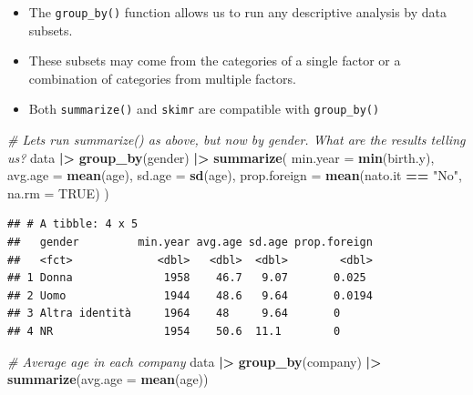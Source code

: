 \documentclass[
]{book}
\newenvironment{Shaded}{\begin{snugshade}}{\end{snugshade}}
\newcommand{\AttributeTok}[1]{\textcolor[rgb]{0.13,0.29,0.53}{#1}}
\newcommand{\CommentTok}[1]{\textcolor[rgb]{0.56,0.35,0.01}{\textit{#1}}}
\newcommand{\ConstantTok}[1]{\textcolor[rgb]{0.56,0.35,0.01}{#1}}
\newcommand{\FunctionTok}[1]{\textcolor[rgb]{0.13,0.29,0.53}{\textbf{#1}}}
\newcommand{\NormalTok}[1]{#1}
\newcommand{\SpecialCharTok}[1]{\textcolor[rgb]{0.81,0.36,0.00}{\textbf{#1}}}
\newcommand{\StringTok}[1]{\textcolor[rgb]{0.31,0.60,0.02}{#1}}
\providecommand{\tightlist}{%
  \setlength{\itemsep}{0pt}\setlength{\parskip}{0pt}}
\begin{document}
\begin{itemize}
\tightlist
\item
  The \texttt{group\_by()} function allows us to run any descriptive analysis by data subsets.
\item
  These subsets may come from the categories of a single factor or a combination of categories from multiple factors.
\item
  Both \texttt{summarize()} and \texttt{skimr} are compatible with \texttt{group\_by()}
\end{itemize}

\begin{Shaded}
\begin{Highlighting}[]
\CommentTok{\# Let\textquotesingle{}s run summarize() as above, but now by gender. What are the results telling us?}
\NormalTok{data }\SpecialCharTok{|\textgreater{}} 
  \FunctionTok{group\_by}\NormalTok{(gender) }\SpecialCharTok{|\textgreater{}} 
  \FunctionTok{summarize}\NormalTok{(}
    \AttributeTok{min.year =} \FunctionTok{min}\NormalTok{(birth.y),}
    \AttributeTok{avg.age =} \FunctionTok{mean}\NormalTok{(age),}
    \AttributeTok{sd.age =} \FunctionTok{sd}\NormalTok{(age),}
    \AttributeTok{prop.foreign =} \FunctionTok{mean}\NormalTok{(nato.it }\SpecialCharTok{==} \StringTok{"No"}\NormalTok{, }\AttributeTok{na.rm =} \ConstantTok{TRUE}\NormalTok{)}
\NormalTok{  )}
\end{Highlighting}
\end{Shaded}

\begin{verbatim}
## # A tibble: 4 x 5
##   gender         min.year avg.age sd.age prop.foreign
##   <fct>             <dbl>   <dbl>  <dbl>        <dbl>
## 1 Donna              1958    46.7   9.07       0.025 
## 2 Uomo               1944    48.6   9.64       0.0194
## 3 Altra identità     1964    48     9.64       0     
## 4 NR                 1954    50.6  11.1        0
\end{verbatim}

\begin{Shaded}
\begin{Highlighting}[]
\CommentTok{\# Average age in each company}
\NormalTok{data }\SpecialCharTok{|\textgreater{}} 
  \FunctionTok{group\_by}\NormalTok{(company) }\SpecialCharTok{|\textgreater{}} 
  \FunctionTok{summarize}\NormalTok{(}\AttributeTok{avg.age =} \FunctionTok{mean}\NormalTok{(age))}
\end{Highlighting}
\end{Shaded}
\end{document}
